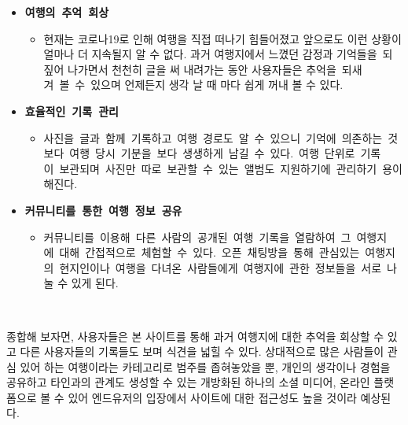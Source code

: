 
\begin{itemize}
    \item \textbf{여행의 추억 회상}
    \begin{itemize}
        \item [] 현재는 코로나19로 인해 여행을 직접 떠나기 힘들어졌고 앞으로도 이런 상황이 얼마나 더 지속될지 알 수 없다. 과거 여행지에서 느꼈던 감정과 기억들을 되짚어 나가면서 천천히 글을 써 내려가는 동안 사용자들은  추억을 되새겨 볼 수 있으며 언제든지 생각 날 때 마다 쉽게 꺼내 볼 수 있다.
    \end{itemize}
\end{itemize}

\begin{itemize}
    \item \textbf{효율적인 기록 관리}
    \begin{itemize}
        \item [] 사진을 글과 함께 기록하고 여행 경로도 알 수 있으니 기억에 의존하는 것보다 여행 당시 기분을 보다 생생하게 남길 수 있다. 여행 단위로 기록이 보관되며 사진만 따로 보관할 수 있는 앨범도 지원하기에 관리하기 용이해진다.
    \end{itemize}
\end{itemize}

\begin{itemize}
    \item \textbf{커뮤니티를 통한 여행 정보 공유}
    \begin{itemize}
        \item [] 커뮤니티를 이용해 다른 사람의 공개된 여행 기록을 열람하여 그 여행지에 대해 간접적으로 체험할 수 있다. 오픈 채팅방을 통해 관심있는 여행지의 현지인이나 여행을 다녀온 사람들에게 여행지에 관한 정보들을 서로 나눌 수 있게 된다.
    \end{itemize}
\end{itemize}
\par\

\begin{tcolorbox}
    종합해 보자면, 사용자들은 본 사이트를 통해 과거 여행지에 대한 추억을 회상할 수 있고 다른 사용자들의 기록들도 보며 식견을 넓힐 수 있다. 상대적으로 많은 사람들이 관심 있어 하는 여행이라는 카테고리로 범주를 좁혀놓았을 뿐, 개인의 생각이나 경험을 공유하고 타인과의 관계도 생성할 수 있는 개방화된 하나의 소셜 미디어, 온라인 플랫폼으로 볼 수 있어 엔드유저의 입장에서 사이트에 대한 접근성도 높을 것이라 예상된다.
\end{tcolorbox}

